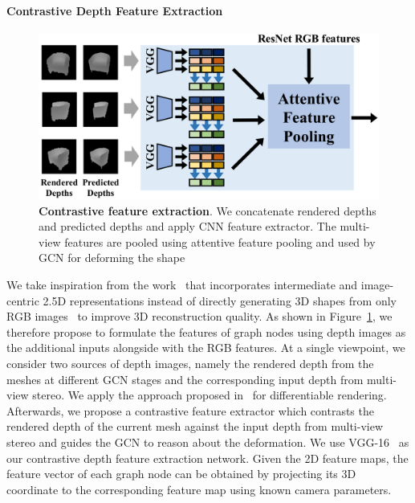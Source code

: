 \label{subsec:contrastive_depth_feature_extraction}
\paragraph{Contrastive Depth Feature Extraction}\vspace{-4mm}
\begin{figure}[th!]
    \begin{center}
        \includegraphics[width=\linewidth]{imgs/contrastive_feature_extractor.png}
    \end{center}
        \caption{\textbf{Contrastive feature extraction}. We concatenate rendered depths and predicted depths and apply CNN feature extractor. The multi-view features are pooled using attentive feature pooling and used by GCN for deforming the shape}
        \label{fig:contrastive_feature_extractor}
\end{figure}

We take inspiration from the work~\cite{yao2020front2back} that incorporates intermediate and image-centric 2.5D representations instead of directly generating 3D shapes from only RGB images~\cite{wang2018pixel2mesh,wen2019pixel2mesh++} to improve 3D reconstruction quality.
As shown in Figure~\ref{fig:contrastive_feature_extractor}, we therefore propose to formulate the features of graph nodes using depth images as the additional inputs alongside with the RGB features.
At a single viewpoint, we consider two sources of depth images, namely the rendered depth from the meshes at different GCN stages and the corresponding input depth from multi-view stereo.
We apply the approach proposed in~\cite{kato2018renderer} for differentiable rendering.
Afterwards, we propose a contrastive feature extractor which contrasts the rendered depth of the current mesh against the input depth from multi-view stereo and guides the GCN to reason about the deformation.
We use VGG-16~\cite{simonyan2014vgg} as our contrastive depth feature extraction network.
Given the 2D feature maps, the feature vector of each graph node can be obtained by projecting its 3D coordinate to the corresponding feature map using known camera parameters.

